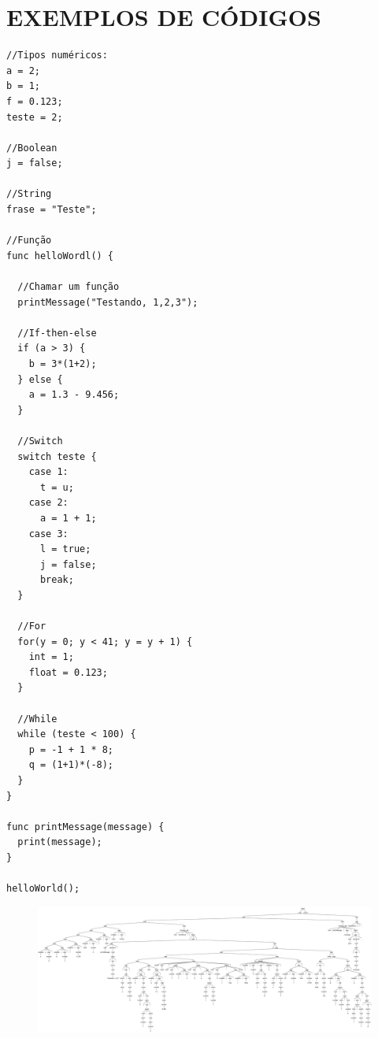 \section{\label{sec3}\normalsize EXEMPLOS DE CÓDIGOS}
	
	\begin{lstlisting}
//Tipos numéricos:
a = 2;
b = 1;
f = 0.123;
teste = 2;
	
//Boolean	
j = false;
	
//String
frase = "Teste";
	
//Função
func helloWordl() {

  //Chamar um função
  printMessage("Testando, 1,2,3");
		
  //If-then-else
  if (a > 3) {
    b = 3*(1+2);
  } else {
    a = 1.3 - 9.456;
  }
		
  //Switch
  switch teste {
    case 1:
      t = u;
    case 2:
      a = 1 + 1;
    case 3:
      l = true;
      j = false;
      break;
  }
		
  //For
  for(y = 0; y < 41; y = y + 1) {
    int = 1;
    float = 0.123;
  }
		
  //While
  while (teste < 100) {
    p = -1 + 1 * 8;
    q = (1+1)*(-8);
  }
}
	
func printMessage(message) {
  print(message);
}

helloWorld();
	\end{lstlisting}	
	\newpage
	\begin{figure}
	\includegraphics[width=1\textheight,height=0.8\textwidth]{01.png}
	\end{figure}